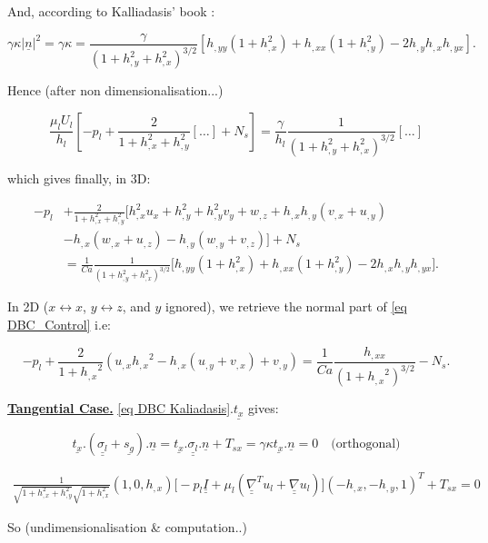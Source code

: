 \documentclass[12pt]{article}
\begin{document}
And, according to Kalliadasis' book \cite{Kalliadasis2011FallingLF}: 

$$\gamma \kappa |\underline{n}|^2 = \gamma \kappa = \frac{\gamma}{(1+h_{,y}^2+h_{,x}^2)^{3/2}}\left[ h_{,yy}(1+h_{,x}^2)+h_{,xx}(1+h_{,y}^2)-2h_{,y}h_{,x}h_{,yx}\right].$$

Hence (after non dimensionalisation...)

$$\frac{\mu_lU_l}{h_l}\left[-p_l+\frac{2}{1+h_{,x}^2+h_{,y}^2}[\dots]+N_s\right]=\frac{\gamma}{h_l}\frac{1}{(1+h_{,y}^2+h_{,x}^2)^{3/2}}[\dots]$$

which gives finally, in 3D:

\begin{equation}
\begin{aligned}
-p_l &+\frac{2}{1+h_{,x}^2+h_{,y}^2}\Big[h_{,x}^2u_x+h_{,y}^2+h_{,y}^2v_y+w_{,z}+h_{,x}h_{,y}(v_{,x}+u_{,y})\\&-h_{,x}(w_{,x}+u_{,z})-h_{,y}(w_{,y}+v_{,z})\Big]+N_s \\&=\frac{1}{Ca}\frac{1}{(1+h_{,y}^2+h_{,x}^2)^{3/2}}\Big[h_{,yy}(1+h_{,x}^2)+h_{,xx}(1+h_{,y}^2)-2h_{,x}h_{,y}h_{,yx}\Big].
\end{aligned}
\end{equation}

In 2D ($x\leftrightarrow x$, $y\leftrightarrow z$, and $y$ ignored), we retrieve the normal part of \eqref{eq DBC_Control} i.e:

\begin{equation*}
\boxed{-p_l + \frac{2}{1+{h_{,x}}^2}(u_{,x}{h_{,x}}^2 - h_{,x}(u_{,y} + v_{,x})+v_{,y}) = \frac{1}{Ca} \frac{h_{,xx}}{(1+{h_{,x}}^2)^{3/2}}-N_s.}
\end{equation*}


\underline{\textbf{Tangential Case.}}
\eqref{eq DBC Kaliadasis}.$\underline{t_x}$ gives: 

$$\underline{t_x}.(\underline{\underline{\sigma_l}}+\underline{s_g}).\underline{n}= \underline{t_x}.\underline{\underline{\sigma_l}}.\underline{n}+T_{sx}=\gamma\kappa\underline{t_x}.\underline{n}=0 \quad \text{(orthogonal)}$$

\begin{align*}
\frac{1}{\sqrt{1+h_{,x}^2+h_{,y}^2}\sqrt{1+h_{,x}^2}}(1, 0, h_{,x})\Big[ -p_l \underline{\underline{I}} + \mu_l(\underline{\underline{\nabla}}^Tu_l+\underline{\underline{\nabla}}u_l)\Big](-h_{,x}, -h_{,y}, 1)^T+T_{sx} = 0
\end{align*}

So (undimensionalisation \& computation..)
\end{document}
